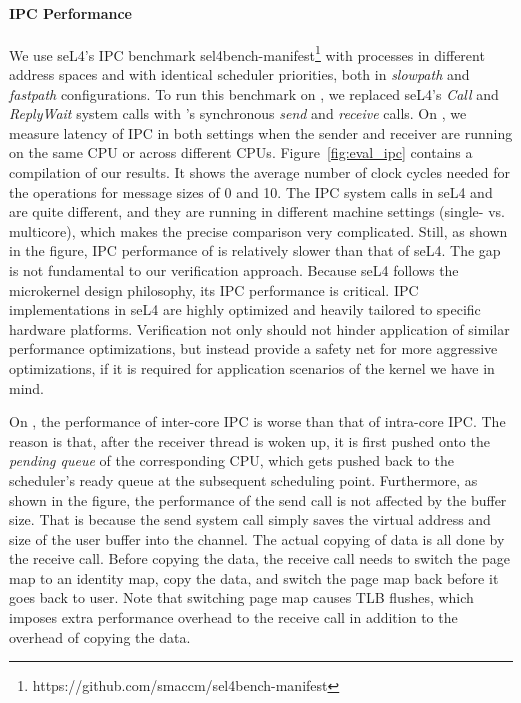 \paragraph{IPC Performance}
We use seL4's IPC benchmark
sel4bench-manifest\footnote{https://github.com/smaccm/sel4bench-manifest}
with processes in different address spaces and with identical
scheduler priorities, both in \emph{slowpath} and \emph{fastpath}
configurations. To run this benchmark on {\cCTOS}, we replaced seL4's
\emph{Call} and \emph{ReplyWait} system calls with \cCTOS's
synchronous \emph{send} and \emph{receive} calls.  On {\cCTOS}, we
measure latency of IPC in both settings when the sender and receiver
are running on the same CPU or across different CPUs.
Figure~\ref{fig:eval_ipc} contains a compilation of our results. It
shows the average number of clock cycles needed for the operations for
message sizes of 0 and 10. The IPC system calls in seL4 and {\cCTOS}
are quite different, and they are running in different machine
settings (single- vs. multicore), which makes the precise
comparison very complicated.  Still, as shown in the figure, IPC
performance of {\cCTOS} is relatively slower than that of seL4. The
gap is not fundamental to our verification approach.  Because seL4
follows the microkernel design philosophy, its IPC performance is
critical. IPC implementations in seL4 are highly optimized and
heavily tailored to specific hardware platforms.
Verification not only
should not hinder application of similar performance optimizations,
but instead provide a safety net for more aggressive optimizations, if
it is required for application scenarios of the kernel we have in
mind.

On {\cCTOS}, the performance of inter-core IPC is worse than that of
intra-core IPC.  The reason is that, after the receiver thread is
woken up, it is first pushed onto the \emph{pending queue} of the
corresponding CPU, which gets pushed back to the scheduler's ready
queue at the subsequent scheduling point. Furthermore, as shown in the
figure, the performance of the send call is not affected by the buffer
size. That is because the send system call simply saves the virtual
address and size of the user buffer into the channel.  The actual
copying of data is all done by the receive call.  Before copying the
data, the receive call needs to switch the page map to an identity
map, copy the data, and switch the page map back before it goes back
to user. Note that switching page map causes TLB flushes, which
imposes extra performance overhead to the receive call in addition to
the overhead of copying the data.

